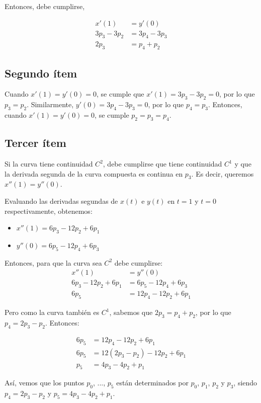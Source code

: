 \documentclass{article}
\begin{document}
Entonces, debe cumplirse,

$$
\begin{aligned}
x'(1) &= y'(0) \\
3p_3 - 3p_2 &= 3p_4 - 3p_3 \\
2p_3 &= p_4 +p_2
\end{aligned}
$$

\subsection*{Segundo ítem}
Cuando $x'(1) = y'(0) = 0$, se cumple que $x'(1) = 3p_3 - 3p_2 = 0$, por lo que $p_3 = p_2$. Similarmente, $y'(0) = 3p_4 - 3p_3 = 0$, por lo que $p_4 = p_3$. Entonces, cuando $x'(1) = y'(0) = 0$, se cumple $p_2 = p_3 = p_4$.

\subsection*{Tercer ítem}
Si la curva tiene continuidad $C^2$, debe cumplirse que tiene continuidad $C^1$ y que la derivada segunda de la curva compuesta es continua en $p_3$. Es decir, queremos $x''(1) = y''(0)$.

Evaluando las derivadas segundas de $x(t)$ e $y(t)$ en $t = 1$ y $t=0$ respectivamente, obtenemos:
\begin{itemize}
    \item $x''(1) = 6p_3 -12p_2 + 6p_1$
    \item $y''(0) = 6p_5 -12p_4 + 6p_3$
\end{itemize}

Entonces, para que la curva sea $C^2$ debe cumplirse:
$$
\begin{aligned}
x''(1) &= y''(0) \\
6p_3 -12p_2 + 6p_1 &= 6p_5 -12p_4 + 6p_3 \\
6p_5 &= 12p_4-12p_2+6p_1
\end{aligned}
$$

Pero como la curva también es $C^1$, sabemos que $2p_3 = p_4 +p_2$, por lo que $p_4 = 2p_3-p_2$. Entonces:

$$
\begin{aligned}
6p_5 &= 12p_4-12p_2+6p_1 \\
6p_5 &= 12(2p_3-p_2)-12p_2+6p_1 \\
p_5 &= 4p_3 - 4p_2 +p_1
\end{aligned}
$$

Así, vemos que los puntos $p_0$, ..., $p_5$ están determinados por $p_0$, $p_1$, $p_2$ y $p_3$, siendo  $p_4 = 2p_3-p_2$ y $p_5 = 4p_3 - 4p_2 +p_1$.
\end{document}

